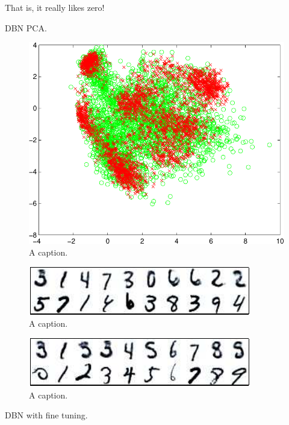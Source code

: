 \documentclass{article} %
\begin{document}
That is, it really likes zero!

DBN PCA.

\begin{figure}[ht]
\centering
\includegraphics[width=0.98\columnwidth]{figures/dbn_pca}
\caption{
A caption.
}
\label{fig:dbn_pca}
\end{figure}

\begin{figure}[ht]
\centering
\includegraphics[width=0.98\columnwidth]{figures/dbn_witness_peaks}
\caption{
A caption.
}
\label{fig:dbn_witness_peaks}
\end{figure}

\begin{figure}[ht]
\centering
\includegraphics[width=0.98\columnwidth]{figures/dbn_cond}
\caption{
A caption.
}
\label{fig:dbn_cond}
\end{figure}

DBN with fine tuning.
\end{document}
